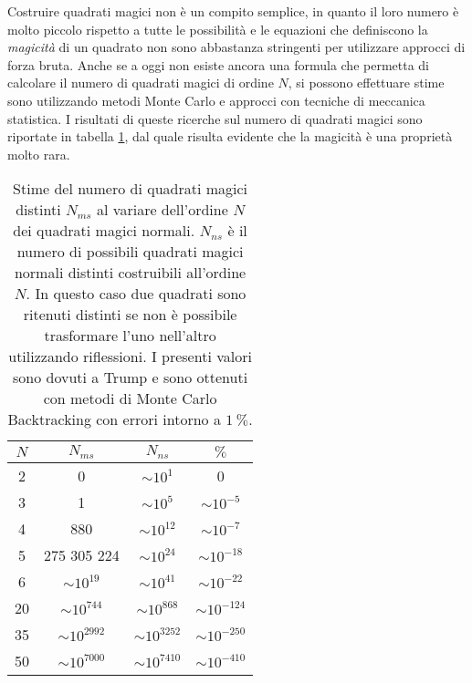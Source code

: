 \documentclass[italian,twoside,twocolumn]{article}
\begin{document}
Costruire quadrati magici non è un compito semplice, in quanto il loro numero è molto piccolo rispetto a tutte le possibilità e le equazioni che definiscono la \emph{magicità} di un quadrato non sono abbastanza stringenti per utilizzare approcci di forza bruta. Anche se a oggi non esiste ancora una formula che permetta di calcolare il numero di quadrati magici di ordine $ N $, si possono effettuare stime sono utilizzando metodi Monte Carlo e approcci con tecniche di meccanica statistica. I risultati di queste ricerche sul numero di quadrati magici sono riportate in tabella \ref{tab:numero_quadrati_magici}, dal quale risulta evidente che la magicità è una proprietà molto rara.

\begin{table}[htbp]
	\centering
	\caption{Stime del numero di quadrati magici distinti $ N_{ms} $ al variare dell'ordine $ N $ dei quadrati magici normali. $ N_{ns} $ è il numero di possibili quadrati magici normali distinti costruibili all'ordine $ N $. In questo caso due quadrati sono ritenuti distinti se non è possibile trasformare l'uno nell'altro utilizzando riflessioni. I presenti valori sono dovuti a Trump \cite{Trump} e sono ottenuti con metodi di Monte Carlo Backtracking con errori intorno a $ \SI{1}{\percent} $. %
		}
	\begin{tabular}{cccc}
		$ N $ &       $ N_{ms} $        &       $ N_{ns} $        &  $ \si{\percent} $   \\ \hline
		2   &            0            &    $ \sim  10^{1} $     &          0           \\
		3   &            1            &     $ \sim 10^{5} $     &   $ \sim 10^{-5} $   \\
		4   &           880           &    $ \sim 10^{12} $     &   $ \sim 10^{-7} $   \\
		5   &       275 305 224       &    $ \sim 10^{24} $     &  $ \sim 10^{-18} $   \\
		6   &    $ \sim 10^{19} $     &    $ \sim 10^{41} $     &  $ \sim 10^{-22} $   \\
		20   &    $ \sim 10^{744} $    &    $ \sim 10^{868} $    &  $ \sim 10^{-124} $  \\
		35   &   $ \sim 10^{2992} $    &   $ \sim 10^{3252} $    &  $ \sim 10^{-250} $  \\
		50   &   $ \sim 10^{7000} $    &   $ \sim 10^{7410} $    &  $ \sim 10^{-410} $\\ \hline
	\end{tabular} 
	\label{tab:numero_quadrati_magici}
\end{table}
\end{document}
